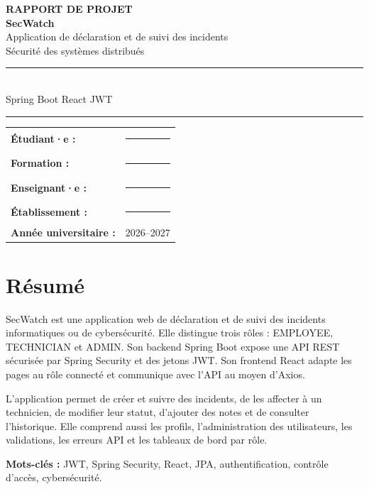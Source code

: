 \documentclass[12pt,a4paper,oneside]{report}
\begin{document}
\begin{titlepage}
  \thispagestyle{empty}
  \centering
  \vspace*{1.3cm}
  {\large\color{teal}\textbf{RAPPORT DE PROJET}}\\[2.6cm]
  {\Huge\bfseries\color{zinc}SecWatch}\\[0.6cm]
  {\Large\color{gris}Application de déclaration et de suivi des incidents}\\[0.4cm]
  {\normalsize\color{gris}Sécurité des systèmes distribués}\\[1.8cm]
  \rule{0.72\textwidth}{0.8pt}\\[0.7cm]
  {\large Spring Boot \quad React \quad JWT}\\[0.7cm]
  \rule{0.72\textwidth}{0.8pt}
  \vfill
  \begin{tabular}{@{}ll@{}}
    \textbf{Étudiant·e :} & \rule{8cm}{0.4pt}\\[0.55cm]
    \textbf{Formation :} & \rule{8cm}{0.4pt}\\[0.55cm]
    \textbf{Enseignant·e :} & \rule{8cm}{0.4pt}\\[0.55cm]
    \textbf{Établissement :} & \rule{8cm}{0.4pt}\\[0.55cm]
    \textbf{Année universitaire :} & 2026--2027
  \end{tabular}
  \vspace*{1.5cm}
\end{titlepage}

\chapter*{Résumé}
SecWatch est une application web de déclaration et de suivi des incidents informatiques ou de cybersécurité. Elle distingue trois rôles : EMPLOYEE, TECHNICIAN et ADMIN. Son backend Spring Boot expose une API REST sécurisée par Spring Security et des jetons JWT. Son frontend React adapte les pages au rôle connecté et communique avec l'API au moyen d'Axios.

L'application permet de créer et suivre des incidents, de les affecter à un technicien, de modifier leur statut, d'ajouter des notes et de consulter l'historique. Elle comprend aussi les profils, l'administration des utilisateurs, les validations, les erreurs API et les tableaux de bord par rôle.

\textbf{Mots-clés :} JWT, Spring Security, React, JPA, authentification, contrôle d'accès, cybersécurité.
\tableofcontents
\clearpage
{}
\end{document}
